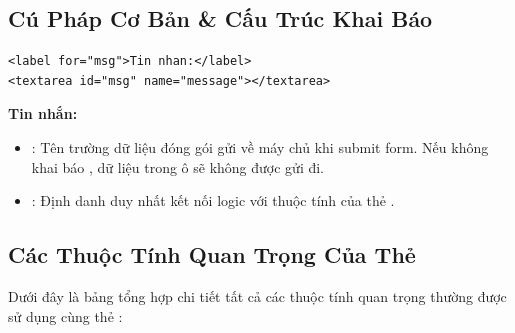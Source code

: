 \subsection{Cú Pháp Cơ Bản \& Cấu Trúc Khai Báo}

\begin{codeWindow}
\begin{lstlisting}[language=HTML5]
<label for="msg">Tin nhan:</label>
<textarea id="msg" name="message"></textarea>
\end{lstlisting}
\end{codeWindow}

\begin{browserWindow}
\sffamily\small
\textbf{Tin nhắn:} \\[4pt]
\end{browserWindow}

\begin{tipBox}
\begin{itemize}[leftmargin=1.2em, itemsep=2pt, parsep=0pt]
    \item {}: Tên trường dữ liệu đóng gói gửi về máy chủ khi submit form. Nếu không khai báo , dữ liệu trong ô sẽ không được gửi đi.
    \item {}: Định danh duy nhất kết nối logic với thuộc tính  của thẻ .
\end{itemize}
\end{tipBox}

\subsection{Các Thuộc Tính Quan Trọng Của Thẻ }

Dưới đây là bảng tổng hợp chi tiết tất cả các thuộc tính quan trọng thường được sử dụng cùng thẻ :

